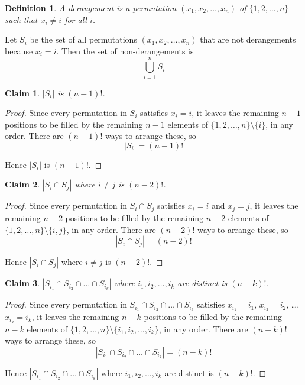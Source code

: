 \documentclass{article}
\newtheorem*{definition}{Definition}
\newtheorem{claim}{Claim}
\begin{document}
\begin{definition}
    A derangement is a permutation $(x_1, x_2, \dots, x_n)$ of $\{1, 2, \dots, n\}$ such that $x_i \neq i$ for all $i$.
\end{definition}

Let $S_i$ be the set of all permutations $(x_1, x_2, \dots, x_n)$ that are not derangements because $x_i = i$. Then the 
set of non-derangements is
\[
\bigcup_{i=1}^n S_i
\]

\begin{claim}
    $|S_i|$ is $(n - 1)!$.
\end{claim}

\begin{proof}
    Since every permutation in $S_i$ satisfies $x_i = i$, it leaves the remaining $n - 1$ positions to be filled by the 
    remaining $n - 1$ elements of $\{1, 2, \dots, n\} \setminus \{i\}$, in any order. There are $(n - 1)!$ ways to 
    arrange these, so
    \[
    |S_i| = (n - 1)!
    \]

    \medskip

    Hence $|S_i|$ is $(n - 1)!$.
\end{proof}

\begin{claim}
    $|S_i \cap S_j|$ where $i \neq j$ is $(n - 2)!$.
\end{claim}

\begin{proof}
    Since every permutation in $S_i \cap S_j$ satisfies $x_i = i$ and $x_j = j$, it leaves the remaining $n - 2$ 
    positions to be filled by the remaining $n - 2$ elements of $\{1, 2, \dots, n\} \setminus \{i, j\}$, in any order. 
    There are $(n - 2)!$ ways to arrange these, so
    \[
    |S_i \cap S_j| = (n - 2)!
    \]

    \medskip

    Hence $|S_i \cap S_j|$ where $i \neq j$ is $(n - 2)!$.
\end{proof}

\begin{claim}
    $|S_{i_1} \cap S_{i_2} \cap \dots \cap S_{i_k}|$ where $i_1, i_2, \dots, i_k$ are distinct is $(n - k)!$.
\end{claim}

\begin{proof}
    Since every permutation in $S_{i_1} \cap S_{i_2} \cap \dots \cap S_{i_k}$ satisfies $x_{i_1} = i_1$, $x_{i_2} = i_2$, 
    \dots, $x_{i_k} = i_k$, it leaves the remaining $n - k$ positions to be filled by the remaining $n - k$ elements of 
    $\{1, 2, \dots, n\} \setminus \{i_1, i_2, \dots, i_k\}$, in any order. There are $(n - k)!$ ways to arrange these, so 
    \[
    |S_{i_1} \cap S_{i_2} \cap \dots \cap S_{i_k}| = (n - k)!
    \]

    \medskip

    Hence $|S_{i_1} \cap S_{i_2} \cap \dots \cap S_{i_k}|$ where $i_1, i_2, \dots, i_k$ are distinct is $(n - k)!$.
\end{proof}
\end{document}
